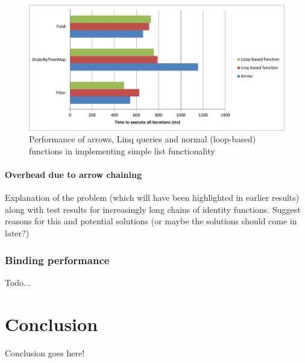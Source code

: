 \documentclass[12pt,twoside,notitlepage]{report}
\begin{document}
\begin{figure}[!ht]
  \centering
  \includegraphics[width=\textwidth]{fig/ListFunctionPerformanceChart.pdf}
  \caption{Performance of arrows, Linq queries and normal (loop-based) functions in implementing simple list functionality}
  \label{fig:list_function_performance}
\end{figure}

\subsubsection{Overhead due to arrow chaining}

Explanation of the problem (which will have been highlighted in earlier results) along with test results for increasingly long chains of identity functions. Suggest reasons for this and potential solutions (or maybe the solutions should come in later?)

\subsection{Binding performance}

Todo...

\cleardoublepage



\chapter{Conclusion}

Conclusion goes here!

\cleardoublepage
\end{document}
